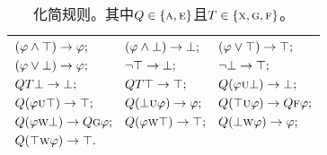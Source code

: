 \begin{table}[h!]%
	\centering\caption{化简规则。其中$Q\in \{\textsc{a}, \textsc{e}\}$且$T\in \{\textsc{x},\textsc{g},\textsc{f}\}$。}\label{tab:simp}
	\begin{tabular}{c}
		\toprule
		$
		\begin{aligned}
						& (\varphi \wedge \top) \rightarrow \varphi;
						&&	(\varphi \wedge \bot) \rightarrow \bot;
						&&  (\varphi \vee \top) \rightarrow \top;\\
						& (\varphi \vee \bot) \rightarrow \varphi; 
						&&  \neg \top \rightarrow \bot; 
						&& \neg \bot \rightarrow \top; \\
						&  QT \bot \rightarrow \bot; 
						&& QT \top \rightarrow \top;  
						&& Q(\varphi \textsc{u} \bot) \rightarrow \bot;\\
						& Q(\varphi \textsc{u} \top) \rightarrow \top;
						&& Q(\bot \textsc{u} \varphi) \rightarrow \varphi;
						&& Q(\top \textsc{u} \varphi) \rightarrow Q\textsc{f} \varphi;\\
						& Q(\varphi \textsc{w} \bot) \rightarrow Q\textsc{g} \varphi;
						&& Q(\varphi \textsc{w} \top) \rightarrow \top; 
						&& Q(\bot \textsc{w} \varphi) \rightarrow \varphi;\\
						& Q(\top \textsc{w} \varphi) \rightarrow \top.
		\end{aligned}
		$\\
		\bottomrule
	\end{tabular}
\end{table}


